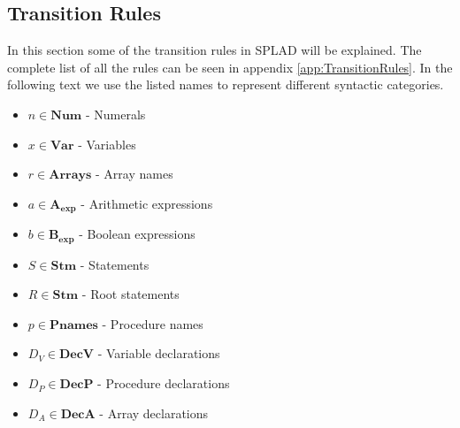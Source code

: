 \subsection{Transition Rules}
In this section some of the transition rules in SPLAD will be explained. The complete list of all the rules can be seen in appendix \ref{app:TransitionRules}.
In the following text we use the listed names to represent different syntactic categories.
\begin{itemize}
\item $n \in \textbf{Num}$ - Numerals
\item $x \in \textbf{Var}$ - Variables 
\item $r \in \textbf{Arrays}$ - Array names
\item $a \in \mathbf{A_{exp}}$ - Arithmetic expressions
\item $b \in \mathbf{B_{exp}}$ - Boolean expressions
\item $S \in \textbf{Stm}$ - Statements
\item $R \in \textbf{Stm}$ - Root statements
\item $p \in \textbf{Pnames}$ - Procedure names
\item $D_V \in \textbf{DecV}$ - Variable declarations
\item $D_P \in \textbf{DecP}$ - Procedure declarations
\item $D_A \in \textbf{DecA}$ - Array declarations
\end{itemize}

